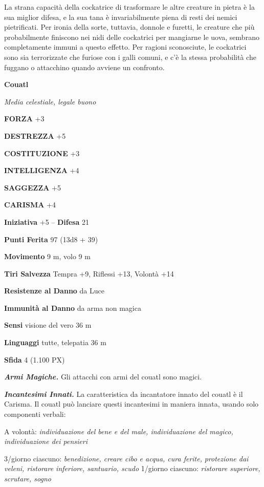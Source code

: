 \begin{multicols}{2}
La strana capacità della cockatrice di trasformare le altre creature in pietra è la sua miglior difesa, e la sua tana è invariabilmente piena di resti dei nemici pietrificati. Per ironia della sorte, tuttavia, donnole e furetti, le creature che più probabilmente finiscono nei nidi delle cockatrici per mangiarne le uova, sembrano completamente immuni a questo effetto. Per ragioni sconosciute, le cockatrici sono sia terrorizzate che furiose con i galli comuni, e c'è la stessa probabilità che fuggano o attacchino quando avviene un confronto.


\medskip{}\textbf{Couatl}

\textit{Media celestiale, legale buono}

\textbf{FORZA} +3

\textbf{DESTREZZA} +5

\textbf{COSTITUZIONE} +3

\textbf{INTELLIGENZA} +4

\textbf{SAGGEZZA} +5

\textbf{CARISMA} +4

\textbf{Iniziativa} +5 -- \textbf{Difesa} 21

\textbf{Punti Ferita} 97 (13d8 + 39)

\textbf{Movimento} 9 m, volo 9 m

\textbf{Tiri Salvezza} Tempra +9, Riflessi +13, Volontà +14

\textbf{Resistenze al Danno} da Luce

\textbf{Immunità al Danno} da arma non magica

\textbf{Sensi} visione del vero 36 m

\textbf{Linguaggi} tutte, telepatia 36 m

\textbf{Sfida} 4 (1.100 PX)

\textit{\textbf{Armi Magiche.}} Gli attacchi con armi del couatl sono magici.

\textit{\textbf{Incantesimi Innati.}} La caratteristica da incantatore innato del couatl è il Carisma. Il couatl può lanciare questi incantesimi in maniera innata, usando solo componenti verbali:

A volontà: \textit{individuazione del bene e del male, individuazione del magico, individuazione dei pensieri}

3/giorno ciascuno: \textit{benedizione, creare cibo e acqua, cura ferite,} \textit{protezione dai veleni, ristorare inferiore, santuario, scudo} 1/giorno ciascuno: \textit{ristorare superiore, scrutare, sogno}


\end{multicols}
